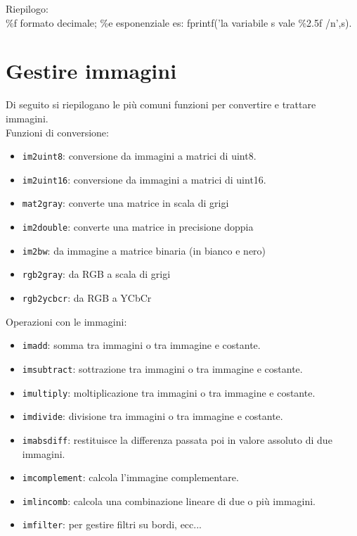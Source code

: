 Riepilogo: \\
\%f formato decimale; \%e esponenziale es: fprintf('la variabile s vale \%2.5f \slash n',s).

\section{Gestire immagini}
Di seguito si riepilogano le più comuni funzioni per convertire e trattare immagini.\\

Funzioni di conversione: \\
\begin{itemize}
    \item	\texttt{im2uint8}: conversione da immagini a matrici di uint8.
    \item	\texttt{im2uint16}: conversione da immagini a matrici di uint16.
    \item	\texttt{mat2gray}: converte una matrice in scala di grigi
    \item	\texttt{im2double}: converte una matrice in precisione doppia
    \item	\texttt{im2bw}: da immagine a matrice binaria (in bianco e nero)
    \item	\texttt{rgb2gray}: da RGB a scala di grigi
    \item	\texttt{rgb2ycbcr}: da RGB a YCbCr
\end{itemize}

Operazioni con le immagini: \\

\begin{itemize}
    \item	\texttt{imadd}: somma tra immagini o tra immagine e costante.
    \item	\texttt{imsubtract}: sottrazione tra immagini o tra immagine e costante.
    \item	\texttt{imultiply}: moltiplicazione tra immagini o tra immagine e costante.
    \item	\texttt{imdivide}: divisione tra immagini o tra immagine e costante.
    \item	\texttt{imabsdiff}: restituisce la differenza passata poi in valore assoluto di due immagini.
    \item	\texttt{imcomplement}: calcola l'immagine complementare.
    \item	\texttt{imlincomb}: calcola una combinazione lineare di due o più immagini.
    \item	\texttt{imfilter}: per gestire filtri su bordi, ecc...
\end{itemize}

